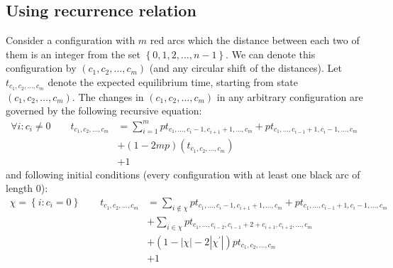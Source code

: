 \documentclass[]{book}
\theoremstyle{definition}
\begin{document}
\subsection{Using recurrence relation}
Consider a configuration with $m$ red arcs which the distance between each two of them is an integer from the set $\left\{ 0,1,2,\hdots,n-1 \right\}$. We can denote this configuration by $\left( c_{1}, c_{2}, \hdots, c_{m} \right)$ (and any circular shift of the distances). Let $t_{c_{1},c_{2},\hdots,c_{m}}$ denote the expected equilibrium time, starting from state $\left( c_{1}, c_{2}, \hdots, c_{m} \right)$. The changes in $\left( c_{1}, c_{2}, \hdots, c_{m} \right)$ in any arbitrary configuration are governed by the following recursive
equation:
\begin{equation}
\begin{split}
    \forall i: c_i \neq 0 \qquad
    t_{c_1, c_2, \hdots, c_m} &= \sum_{i = 1}^{m} pt_{c_1, \hdots, c_{i}-1, c_{i+1}+1, \hdots, c_m} + pt_{c_1, \hdots, c_{i-1}+1, c_{i}-1, \hdots, c_m} \\
    &+ \left(1 - 2mp\right)\left( t_{c_{1}, c_{2}, \hdots, c_{m}} \right) \\
    &+ 1
\end{split}
\end{equation}
and following initial conditions (every configuration with at least one black arc of length 0):
\begin{equation}
\begin{split}
    \chi = \left\{ i:c_i = 0 \right\} \qquad t_{c_1, c_2, \hdots, c_m} &= \sum_{i \notin \chi} pt_{c_1, \hdots, c_{i}-1, c_{i+1}+1, \hdots, c_m} + pt_{c_1, \hdots, c_{i-1}+1, c_{i}-1, \hdots, c_m} \\
    &+ \sum_{i \in \chi} pt_{c_1, \hdots, c_{i-2}, c_{i-1} + 2 + c_{i+1}, c_{i+2}, \hdots, c_m} \\
    &+ \left( 1 - |\chi| - 2|\chi^\prime| \right)pt_{c_1, c_2, \hdots, c_m} \\
    &+ 1
\end{split}
\end{equation}


\newpage
\vspace{0.2 cm}
\end{document}
